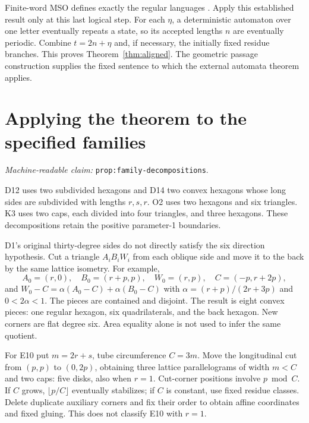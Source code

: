 \documentclass[11pt]{amsart}
\newcommand{\record}[1]{\nolinkurl{#1}}
\newcommand{\claimid}[1]{\par\nopagebreak\noindent\textit{Machine-readable claim:} \record{#1}.\par}
\theoremstyle{definition}\newtheorem{definition}{Definition}
\begin{document}
Finite-word MSO defines exactly the regular languages
\cite[Section 3.1, Theorem 3.2]{MSO}. Apply this established result
only at this last logical step. For each $\eta$, a deterministic
automaton over one letter eventually repeats a state, so its accepted
lengths $n$ are eventually periodic. Combine $t=2n+\eta$ and, if
necessary, the initially fixed residue branches. This proves
Theorem~\ref{thm:aligned}. The geometric passage construction supplies
the fixed sentence to which the external automata theorem applies.

\section{Applying the theorem to the specified families}\label{sec:families}
\label{prop:family-decompositions}\claimid{prop:family-decompositions}
D12 uses two subdivided hexagons and D14
two convex hexagons whose long sides are subdivided with lengths
$r,s,r$. O2 uses two hexagons and six triangles. K3 uses two caps,
each divided into four triangles, and three hexagons. These
decompositions retain the positive parameter-1 boundaries.

D1's original thirty-degree sides do not directly satisfy the six
direction hypothesis. Cut a triangle $A_iB_iW_i$ from each oblique side
and move it to the back by the same lattice isometry. For example,
\[
 A_0=(r,0),\quad B_0=(r+p,p),\quad W_0=(r,p),\quad C=(-p,r+2p),
\]
and $W_0-C=\alpha(A_0-C)+\alpha(B_0-C)$ with
$\alpha=(r+p)/(2r+3p)$ and $0<2\alpha<1$. The pieces are contained
and disjoint. The result is eight convex pieces: one regular hexagon,
six quadrilaterals, and the back hexagon. New corners are flat degree
six. Area equality alone is not used to infer the same quotient.

For E10 put $m=2r+s$, tube circumference $C=3m$. Move the longitudinal
cut from $(p,p)$ to $(0,2p)$, obtaining three lattice parallelograms
of width $m<C$ and two caps: five disks, also when $r=1$. Cut-corner
positions involve $p\bmod C$. If $C$ grows, $\lfloor p/C\rfloor$
eventually stabilizes; if $C$ is constant, use fixed residue classes.
Delete duplicate auxiliary corners and fix their order to obtain
affine coordinates and fixed gluing. This does not classify E10 with
$r=1$.
\end{document}
